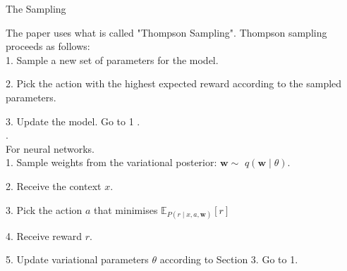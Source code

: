 \documentclass[8pt,xcolor=dvipsnames,compress]{beamer}
\begin{document}
\begin{frame}{The Sampling}

The paper uses what is called "Thompson Sampling". Thompson sampling proceeds as follows: \\

1. Sample a new set of parameters for the model.

2. Pick the action with the highest expected reward according to the sampled parameters.

3. Update the model. Go to 1 .\\
.\\
For neural networks.\\
1. Sample weights from the variational posterior: $\mathbf{w} \sim$ $q(\mathbf{w} \mid \theta)$.

2. Receive the context $x$.

3. Pick the action $a$ that minimises $\mathbb{E}_{P(r \mid x, a, \mathbf{w})}[r]$

4. Receive reward $r$.

5. Update variational parameters $\theta$ according to Section 3. Go to 1.


\end{frame}
\end{document}

